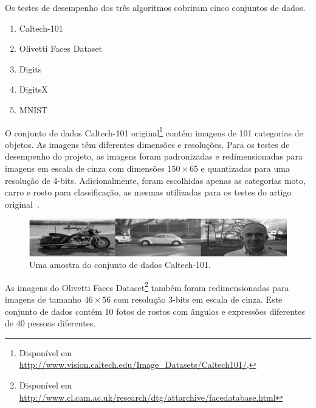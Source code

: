 \documentclass[12pt]{article}
\theoremstyle{plain}
\numberwithin{equation}{section}
\begin{document}
Os testes de desempenho dos três algoritmos cobriram cinco conjuntos de dados.

\begin{enumerate}[label=\,(\alph*)]
  \item Caltech-101~\cite{caltech101}
  \item Olivetti Faces Dataset~\cite{olivetti}
  \item Digits~\cite{digits}
  \item DigitsX~\cite{digitsx}
  \item MNIST~\cite{mnist}
\end{enumerate}

O conjunto de dados Caltech-101 original\footnote{Disponível em
  \url{http://www.vision.caltech.edu/Image_Datasets/Caltech101/}.} contém imagens de 101 categorias
de objetos. As imagens têm diferentes dimensões e resoluções. Para os testes de desempenho do
projeto, as imagens foram padronizadas e redimensionadas para imagens em escala de cinza com
dimensões $150\times 65$ e quantizadas para uma resolução de 4-bits.  Adicionalmente, foram
escolhidas apenas as categorias moto, carro e rosto para classificação, as mesmas utilizadas para
os testes do artigo original~\cite{poon-domingos}.

\begin{figure}[h]
  \centering\includegraphics[scale=1.0]{imgs/caltech_sample.png}
  \caption{Uma amostra do conjunto de dados Caltech-101.}
\end{figure}

As imagens do Olivetti Faces Dataset\footnote{Disponível em
  \url{http://www.cl.cam.ac.uk/research/dtg/attarchive/facedatabase.html}} também foram
redimensionadas para imagens de tamanho $46\times 56$ com resolução 3-bits em escala de cinza. Este
conjunto de dados contém 10 fotos de rostos com ângulos e expressões diferentes de 40 pessoas
diferentes.
\end{document}
